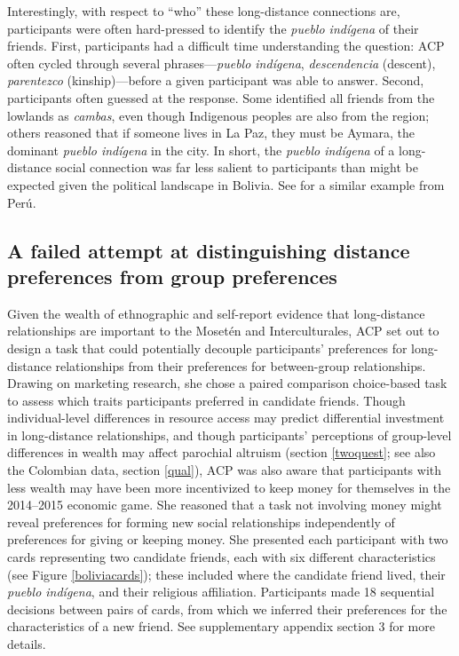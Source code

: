 \documentclass[bibauthoryear]{aa}
\begin{document}
	Interestingly, with respect to ``who'' these long-distance connections are, participants were often hard-pressed to identify the \textit{pueblo ind\'igena} of their friends. First, participants had a difficult time understanding the question: ACP often cycled through several phrases---\textit{pueblo ind\'igena}, \textit{descendencia} (descent), \textit{parentezco} (kinship)---before a given participant was able to answer. Second, participants often guessed at the response. Some identified all friends from the lowlands as \textit{cambas}, even though Indigenous peoples are also from the region; others reasoned that if someone lives in La Paz, they must be Aymara, the dominant \textit{pueblo ind\'igena} in the city. In short, the \textit{pueblo ind\'igena} of a long-distance social connection was far less salient to participants than might be expected given the political landscape in Bolivia. See \citet{moya2015different} for a similar example from Per\'u.

\subsection{A failed attempt at distinguishing distance preferences from group preferences}

Given the wealth of ethnographic and self-report evidence that long-distance relationships are important to the Moset\'en and Interculturales, ACP set out to design a task that could potentially decouple participants' preferences for long-distance relationships from their preferences for between-group relationships. Drawing on marketing research, she chose a paired comparison choice-based task \citep{rao2014applied} to assess which traits participants preferred in candidate friends. Though individual-level differences in resource access may predict differential investment in long-distance relationships, and though participants' perceptions of group-level differences in wealth may affect parochial altruism (section \ref{twoquest}; see also the Colombian data, section \ref{qual}), ACP was also aware that participants with less wealth may have been more incentivized to keep money for themselves in the 2014--2015 economic game. She reasoned that a task not involving money might reveal preferences for forming new social relationships independently of preferences for giving or keeping money. She presented each participant with two cards representing two candidate friends, each with six different characteristics (see Figure \ref{boliviacards}); these included where the candidate friend lived, their \textit{pueblo ind\'igena}, and their religious affiliation. Participants made 18 sequential decisions between pairs of cards, from which we inferred their preferences for the characteristics of a new friend. See supplementary appendix section 3 for more details.
\end{document}
